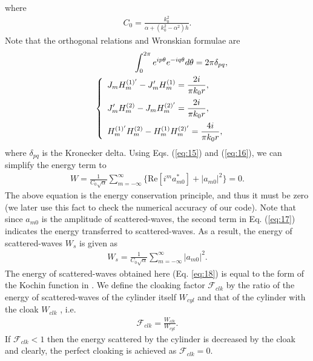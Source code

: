 \documentclass{jfm}
\begin{document}
where 
\begin{eqnarray}
\displaystyle C_0=\frac{k_0^2}{\alpha+(k_0^2-\alpha^2)h}.
\label{eq:14}
\end{eqnarray}
Note that the orthogonal relations and  Wronskian formulae are \cite[see][]{Kashiwagi2001} 
\begin{eqnarray}
\displaystyle &&\int_0^{2\pi}e^{ip\theta}e^{-iq\theta}d\theta=2\pi \delta _{pq},
\label{eq:15}\\
\displaystyle &&\left\{
  \begin{array}{l}
  \vspace{2mm}
\displaystyle J_mH_m^{(1)'}-J_m'H_m^{(1)}=\frac{2i}{\pi k_0r},\\
\vspace{2mm}
\displaystyle J_m'H_m^{(2)}-J_mH_m^{(2)'}=\frac{2i}{\pi k_0r},\\
\displaystyle H_m^{(1)'}H_m^{(2)}-H_m^{(1)}H_m^{(2)'}=\frac{4i}{\pi k_0r},
  \end{array} 
\right. 
\label{eq:16}
\end{eqnarray}
where $\delta_{pq}$ is the Kronecker delta.
Using Eqs. (\ref{eq:15}) and (\ref{eq:16}), we can simplify the energy term to
\begin{eqnarray}
\displaystyle W=\frac{1}{C_0\sqrt{\alpha}}\sum_{m=-\infty}^\infty\bigg\{\text{Re} [i^m a_{m0}^*]+|a_{m0}|^2 \bigg\}=0.
\label{eq:17}
\end{eqnarray}
The above equation is the energy conservation principle, and thus it must be zero (we later use this fact to check the numerical accuracy of our code). Note that since $a_{m0}$ is the amplitude of scattered-waves, the second term in Eq. (\ref{eq:17}) indicates the energy transferred to scattered-waves. As a result, the energy of scattered-waves $W_s$ is given as 
\begin{eqnarray}
\displaystyle W_s=\frac{1}{C_0\sqrt{\alpha}}\sum_{m=-\infty}^\infty|a_{m0}|^2.
\label{eq:18}
\end{eqnarray}
The energy of scattered-waves obtained here (Eq. \eqref{eq:18}) is equal to the form of the Kochin function in \cite{Newman2014}. We define the cloaking factor $\mathcal{F}_{clk}$  by the ratio of the energy of scattered-waves of the cylinder itself $W_{cyl}$ and that of the cylinder with the cloak $W_{clk}$  \cite[]{Porter2014}, i.e. 
\begin{eqnarray}
\displaystyle \mathcal{F}_{clk}=\frac{W_{clk}}{W_{cyl}}.
\label{eq:211} 
\end{eqnarray}
If  $\mathcal{F}_{clk}<1$ then the energy scattered by the cylinder is decreased by the cloak and clearly, the perfect cloaking is achieved as $\mathcal{F}_{clk}=0$.
\end{document}
